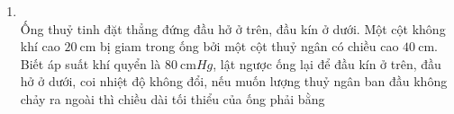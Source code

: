 \begin{enumerate}[label=\bfseries Câu \arabic*:, leftmargin=1.7cm]
\item {}\\
Ống thuỷ tinh đặt thẳng đứng đầu hở ở trên, đầu kín ở dưới. Một cột không khí cao $\SI{20}{\centi\meter}$ bị giam trong ống bởi một cột thuỷ ngân có chiều cao $\SI{40}{\centi\meter}$. Biết áp suất khí quyển là $\SI{80}{\centi\meter Hg}$, lật ngược ống lại để đầu kín ở trên, đầu hở ở dưới, coi nhiệt độ không đổi, nếu muốn lượng thuỷ ngân ban đầu không chảy ra ngoài thì chiều dài tối thiểu của ống phải bằng


\end{enumerate}
